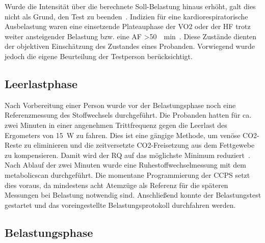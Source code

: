 Wurde die Intensität über die berechnete Soll-Belastung hinaus erhöht, galt dies nicht als Grund, den Test zu beenden~\cite{Wonisch.2008}. Indizien für eine kardiorespiratorische Ausbelastung waren eine einsetzende Plateauphase der \acs{VO2} oder der \acs{HF} trotz weiter ansteigender Belastung bzw. eine \acs{AF} >\SI{50}{\per\minute}~\cite{Kroidl.2015}. Diese Zustände dienten der objektiven Einschätzung des Zustandes eines Probanden. Vorwiegend wurde jedoch die eigene Beurteilung der Testperson berücksichtigt. 

\subsection{Leerlastphase}

Nach Vorbereitung einer Person wurde vor der Belastungsphase noch eine Referenzmessung des Stoffwechsels durchgeführt. Die Probanden hatten für ca. zwei Minuten in einer angenehmen Trittfrequenz gegen die Leerlast des Ergometers von \SI{15}{\watt} zu fahren. Dies ist eine gängige Methode, um venöse \acs{CO2}-Reste zu eliminieren und die zeitversetzte  \acs{CO2}-Freisetzung aus dem Fettgewebe zu kompensieren. Damit wird der \acs{RQ} auf das möglichste Minimum reduziert~\cite{Kroidl.2015}. Nach Ablauf der zwei Minuten wurde eine Ruhestoffwechselmessung mit dem metabolicscan durchgeführt. Die momentane Programmierung der \acs{CCPS} setzt dies voraus, da mindestens acht Atemzüge als Referenz für die späteren Messungen bei Belastung notwendig sind. Anschließend konnte der Belastungstest gestartet und das voreingestellte Belastungsprotokoll durchfahren werden.

\subsection{Belastungsphase}

